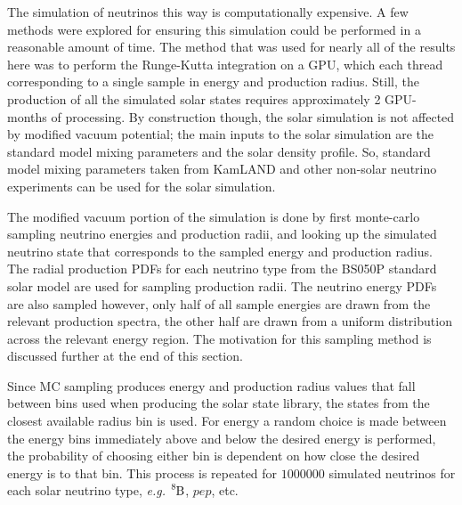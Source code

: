 The simulation of neutrinos this way is computationally expensive. A few methods
were explored for ensuring this simulation could be performed in a reasonable
amount of time. The method that was used for nearly all of the results here was
to perform the Runge-Kutta integration on a GPU, which each thread corresponding
to a single sample in energy and production radius.
Still, the production of all the simulated solar states requires approximately
2 GPU-months of processing.
By construction though, the solar simulation is not affected by modified
vacuum potential; the main inputs to the solar simulation are the standard model
mixing parameters and the solar density profile. So, standard model mixing parameters
taken from KamLAND and other non-solar neutrino experiments can be used for
the solar simulation.


The modified vacuum portion of the simulation is done by first monte-carlo sampling
neutrino energies and production radii, and looking up the simulated
neutrino state that corresponds to the sampled energy and production radius.
The radial production PDFs for each neutrino type from the BS050P standard
solar model are used for sampling production radii.
The neutrino energy PDFs are also sampled
however, only half of all sample energies are drawn from the relevant production
spectra, the other half are drawn from a uniform distribution across the
relevant energy region.
The motivation for this sampling method is discussed further at the end of
this section.

Since MC sampling produces energy and production radius values that fall
between bins used when producing the solar state library, the states
from the closest available radius bin is used. For energy
a random choice is made between the energy bins immediately above and below
the desired energy is performed, the probability of choosing either bin
is dependent on how close the desired energy is to that bin.
This process is repeated for $1000000$ simulated neutrinos for each solar
neutrino type, \textit{e.g.} $\ce{^{8}B}$, $pep$, etc.

